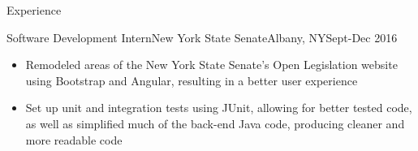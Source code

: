 \documentclass[]{xjavathehutt}
\begin{document}
\begin{cvsection}{Experience}
  \begin{cvsubsection}{Software Development Intern}{New York State Senate}{Albany, NY}{Sept-Dec 2016}
    \begin{itemize}
      \item{Remodeled areas of the New York State Senate's Open Legislation website using Bootstrap
        and Angular, resulting in a better user experience}
      \item{Set up unit and integration tests using JUnit, allowing for better tested code, as well
        as simplified much of the back-end Java code, producing cleaner and more readable code}
    \end{itemize}
  \end{cvsubsection}
\end{cvsection}


\end{document}

